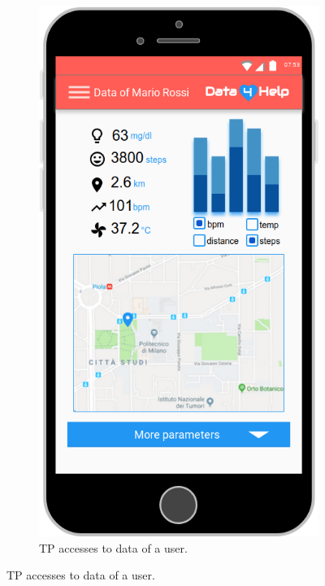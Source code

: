 \begin{figure}[ht]
  \begin{subfigure}[t]{0.38\linewidth}
    \includegraphics[width=\linewidth]{images/Mock-up/IndividualDataTP.png}
    \caption{TP accesses to data of a user.}
  \end{subfigure}
\end{figure}

